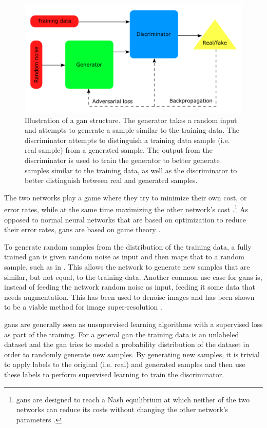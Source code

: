\begin{figure}[htbp]  
    \centering
    \includegraphics[width=.8\textwidth]{figures/gan.pdf}
    \caption[Illustration of a GAN structure]{Illustration of a \gls{gan} structure. The generator takes a random input and attempts to generate a sample similar to the training data. The discriminator attempts to distinguish a training data sample (i.e. real sample) from a generated sample. The output from the discriminator is used to train the generator to better generate samples similar to the training data, as well as the discriminator to better distinguish between real and generated samples. }
    \label{fig:gan}
\end{figure}

The two networks play a game where they try to minimize their own cost, or error rates, while at the same time maximizing the other network's cost \cite{goodfellow2020gan}.\footnote{\gls{gan}s are designed to reach a Nash equilibrium at which neither of the two networks can reduce its costs without changing the other network's parameters \cite{liu2020tomogan}.} As opposed to normal neural networks that are based on optimization to reduce their error rates, \gls{gan}s are based on game theory \cite{goodfellow2020gan}. 

To generate random samples from the distribution of the training data, a fully trained \gls{gan} is given random noise as input and then maps that to a random sample, such as in \cite{zhangsagan}. This allows the network to generate new samples that are similar, but not equal, to the training data. Another common use case for \gls{gan}s is, instead of feeding the network random noise as input, feeding it some data that needs augmentation. This has been used to denoise images and has been shown to be a viable method for image super-resolution \cite{8710893,Ledig_2017_CVPR}. 

\glspl{gan} are generally seen as unsupervised learning algorithms with a supervised loss as part of the training. For a general \gls{gan} the training data is an unlabeled dataset and the \gls{gan} tries to model a probability distribution of the dataset in order to randomly generate new samples. By generating new samples, it is trivial to apply labels to the original (i.e. real) and generated samples and then use these labels to perform supervised learning to train the discriminator. 

